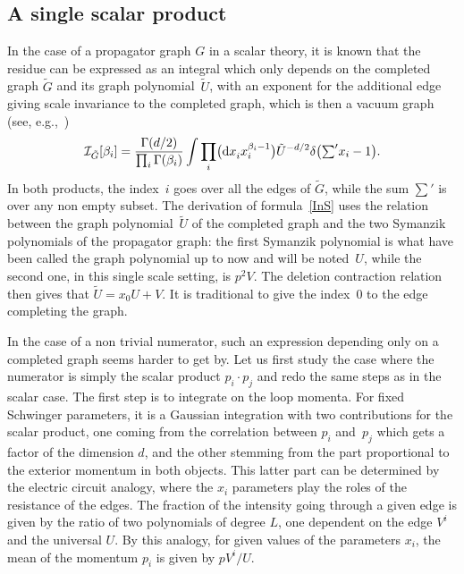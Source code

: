 \documentclass[11pt]{article}
\numberwithin{equation}{section}
\def\cI{{\mathcal I}}
\begin{document}
\subsection{A single scalar product}

In the case of a propagator graph $G$ in a scalar theory, it is known that the residue can be expressed as an integral which
only depends on the completed graph $\tilde G$ and its graph polynomial~$\tilde U$, with an exponent
for the additional edge giving scale invariance to the completed graph, which is then a vacuum graph (see, e.g.,~\cite{Sch10})
\begin{equation} \label{InS}
	\cI_{\tilde G} [\beta_i] = \frac {\Gamma(d/2)} {\prod_i \Gamma(\beta_i)}
			\int \prod_i \bigl( {\rm d}x_i^{\vphantom {\beta_i}} x_i^{\beta_i-1}\bigr)
			\tilde U^{-d/2} \delta \bigl(\textstyle{ \sum' }x_i -1\bigr).
\end{equation}
In both products, the index~$i$ goes over all the edges of $\tilde G$, while the sum $\sum'$ is over any non
empty subset.
The derivation of formula~\eqref{InS} uses the relation between the graph polynomial~$\tilde U$ of the completed
graph and the two Symanzik polynomials of the propagator graph: the first Symanzik polynomial is what have been called the graph
polynomial up to now and will be noted~$U$, while the second one, in this single scale setting, is $p^2 V$. The
deletion contraction relation then gives that $\tilde U = x_0 U + V$. It is traditional to give the
index~0 to the edge completing the graph.

In the case of a non trivial numerator, such an expression depending only on a completed graph seems harder to get by. Let us first study the case where the numerator is simply the scalar product $p_i\cdot p_j$ and redo the same steps as in the scalar case.
The first step is to integrate on the loop momenta. For fixed Schwinger parameters, it is a Gaussian integration with two
contributions for the scalar product, one coming from the correlation between $p_i$ and~$p_j$ which gets a factor of the dimension $d$, and the other stemming from the part proportional to the exterior momentum in both objects.
This latter part can be determined by the electric circuit analogy, where the $x_i$ parameters play the roles of
the resistance of the edges. The fraction of the intensity going through a given edge is given by the ratio of two
polynomials of degree $L$, one dependent on the edge $V^i$ and the universal $U$. By this analogy, for given
values of the parameters $x_i$, the mean of the momentum $p_i$ is given by $ p V^i/U$.
\end{document}
